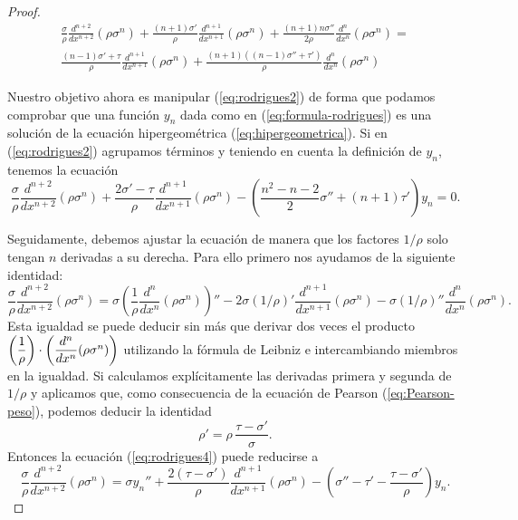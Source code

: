 \begin{proof}
    \begin{multline}
        \label{eq:rodrigues2}
        \frac{\sigma}{\rho} \frac{d^{n+2}}{d x^{n+2}} \left(\rho\sigma^n\right) + \frac{(n+1)\sigma'}{\rho}\frac{d^{n+1}}{d x^{n+1}} \left(\rho\sigma^n \right) + \frac{(n+1)n\sigma''}{2\rho}\frac{d^{n}}{d x^{n}} \left(\rho\sigma^n \right) =\\  \frac{(n-1)\sigma'+\tau}{\rho}\frac{d^{n+1}}{d x^{n+1}}\left(\rho\sigma^n \right) + \frac{(n+1)\left((n-1)\sigma'' + \tau'\right)}{\rho}\frac{d^{n}}{d x^{n}}\left(\rho\sigma^n \right)
    \end{multline}
    
    Nuestro objetivo ahora es manipular (\ref{eq:rodrigues2}) de forma que podamos comprobar que una función $y_n$ dada como en (\ref{eq:formula-rodrigues}) es una solución de la ecuación hipergeométrica (\ref{eq:hipergeometrica}). Si en (\ref{eq:rodrigues2}) agrupamos términos y teniendo en cuenta la definición de $y_n$, tenemos la ecuación
    \begin{equation}
        \label{eq:rodrigues3}
        \frac{\sigma}{\rho} \frac{d^{n+2}}{d x^{n+2}} \left(\rho\sigma^n\right) + \frac{2\sigma'-\tau}{\rho} \frac{d^{n+1}}{d x^{n+1}} \left(\rho\sigma^n \right) - \left(\frac{n^2-n-2}{2}\sigma'' + (n+1)\tau'\right)y_n =0.
    \end{equation}

    Seguidamente, debemos ajustar la ecuación de manera que los factores $1/\rho$ solo tengan $n$ derivadas a su derecha. Para ello primero nos ayudamos de la siguiente identidad:
    \begin{equation}
        \label{eq:rodrigues4}
        \frac{\sigma}{\rho} \frac{d^{n+2}}{d x^{n+2}} \left(\rho\sigma^n\right) = \sigma \left(\dfrac 1 {\rho} \dfrac{d^n}{dx^n} (\rho\sigma^n)\right)'' - 2\sigma (1/\rho)' \frac{d^{n+1}}{d x^{n+1}} \left(\rho\sigma^n \right) -\sigma (1/\rho)'' \dfrac{d^n}{dx^n} (\rho\sigma^n).
    \end{equation}
    Esta igualdad se puede deducir sin más que derivar dos veces el producto $\left(\dfrac 1 {\rho}\right)\cdot\nolinebreak\left(\dfrac{d^n}{dx^n} (\rho\sigma^n)\right)$ utilizando la fórmula de Leibniz e intercambiando miembros en la igualdad. Si calculamos explícitamente las derivadas primera y segunda de $1/\rho$ y aplicamos que, como consecuencia de la ecuación de Pearson (\ref{eq:Pearson-peso}), podemos deducir la identidad
    \begin{equation}
        \label{eq:derivada-rho}
        \rho' = \rho\,\frac{\tau-\sigma'}{\sigma}.
    \end{equation}
    Entonces la ecuación (\ref{eq:rodrigues4}) puede reducirse a 
    \begin{equation}
        \label{eq:rodrigues5}
        \frac{\sigma}{\rho} \frac{d^{n+2}}{d x^{n+2}} \left(\rho\sigma^n\right) = \sigma y_n'' + \frac{2(\tau-\sigma')}\rho\frac{d^{n+1}}{d x^{n+1}} \left(\rho\sigma^n \right) - \left(\sigma'' - \tau' - \dfrac{\tau-\sigma'}\rho\right)y_n.
    \end{equation}


\end{proof}
